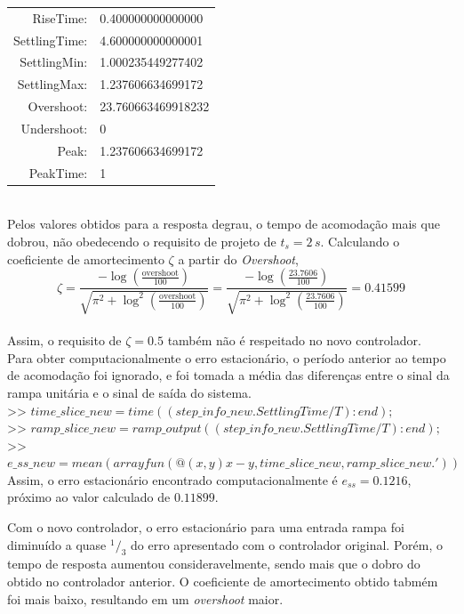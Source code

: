 \documentclass{article}
\begin{document}
{        \begin{tabular}{ r l }
            RiseTime:& 0.400000000000000\\
            SettlingTime:& 4.600000000000001\\
            SettlingMin:& 1.000235449277402\\
            SettlingMax:& 1.237606634699172\\
            Overshoot:& 23.760663469918232\\
            Undershoot:& 0\\
            Peak:& 1.237606634699172\\
            PeakTime:& 1\\
        \end{tabular}\\

        {Pelos valores obtidos para a resposta degrau, o tempo de acomodação
            mais que dobrou, não obedecendo o requisito de projeto de $t_s =2\,s$.
            Calculando o coeficiente de amortecimento $\zeta$ a partir do
            \textit{Overshoot},}
        \[ \zeta = \frac{-\log\left( \frac{\text{overshoot}}{100} \right)}{ \sqrt{ \pi^2 + \log^2\left( \frac{\text{overshoot}}{100} \right) } }
            = \frac{-\log\left( \frac{23.7606}{100} \right)}{ \sqrt{ \pi^2 + \log^2\left( \frac{23.7606}{100} \right) } }
            = 0.41599 \]\\

        {Assim, o requisito de $\zeta = 0.5$ também não é respeitado no novo
            controlador.}\\

        {Para obter computacionalmente o erro estacionário, o período anterior
            ao tempo de acomodação foi ignorado, e foi tomada a média das
            diferenças entre o sinal da rampa unitária e o sinal de saída do sistema.\\
        >> $ time\_slice\_new = time((step\_info\_new.SettlingTime/T):end); $\\
        >> $ ramp\_slice\_new = ramp\_output((step\_info\_new.SettlingTime/T):end); $\\
        >> $ e\_ss\_new = mean(arrayfun(@(x,y) x - y, time\_slice\_new, ramp\_slice\_new.')) $ }\\

        {Assim, o erro estacionário encontrado computacionalmente é
            $e_{ss} = 0.1216$, próximo ao valor calculado de $0.11899$.}

        {Com o novo controlador, o erro estacionário para uma entrada rampa foi
            diminuído a quase $^1/_3$ do erro apresentado com o controlador
            original. Porém, o tempo de resposta aumentou consideravelmente,
            sendo mais que o dobro do obtido no controlador anterior. O coeficiente
            de amortecimento obtido tabmém foi mais baixo, resultando em um
            \textit{overshoot} maior.}

}
\end{document}
